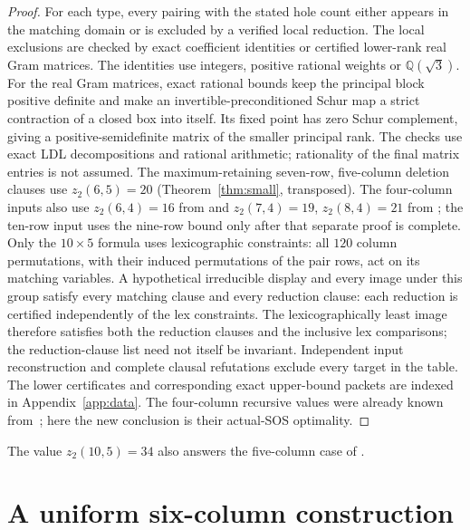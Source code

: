 \documentclass[11pt,a4paper]{article}
\theoremstyle{definition}
\newcommand{\zt}{z_2}
\newcommand{\Q}{\mathbb Q}
\begin{document}
\begin{proof}
For each type, every pairing with the stated hole count either appears
in the matching domain or is excluded by a verified local reduction. The local exclusions are checked by
exact coefficient identities or certified lower-rank real Gram matrices.
The identities use integers, positive rational weights or $\Q(\sqrt3)$.
For the real Gram matrices, exact rational bounds keep the principal
block positive definite and make an invertible-preconditioned Schur map
a strict contraction of a closed box into itself. Its fixed point has
zero Schur complement, giving a positive-semidefinite matrix of the
smaller principal rank. The checks use exact LDL decompositions and
rational arithmetic; rationality of the final matrix entries is not assumed. The maximum-retaining seven-row, five-column deletion clauses use
$\zt(6,5)=20$ (Theorem~\ref{thm:small}, transposed).
The four-column inputs also use $\zt(6,4)=16$ from
\cite[Corollary~4.23]{LQ} and $\zt(7,4)=19$, $\zt(8,4)=21$ from
\cite[Theorems~4.2 and~4.4]{XY}; the ten-row input uses the nine-row
bound only after that separate proof is complete. Only the $10\times5$ formula uses lexicographic constraints: all $120$
column permutations, with their induced permutations of the pair rows,
act on its matching variables. A hypothetical irreducible display and
every image under this group satisfy every matching clause and every
reduction clause: each reduction is certified independently of the lex
constraints. The lexicographically least image therefore satisfies both the
reduction clauses and the inclusive lex comparisons; the reduction-clause
list need not itself be invariant.
Independent input reconstruction and
complete clausal refutations exclude every target in the table. The
lower certificates and corresponding exact upper-bound packets are
indexed in Appendix~\ref{app:data}. The four-column recursive values
were already known from~\cite{CC}; here the new conclusion is their
actual-SOS optimality.
\end{proof}

The value $\zt(10,5)=34$ also answers the five-column case of
\cite[Section~8, Open Problem~1]{CLQIncidence}.


\section{A uniform six-column construction}\label{sec:sixconstruction}
\end{document}
